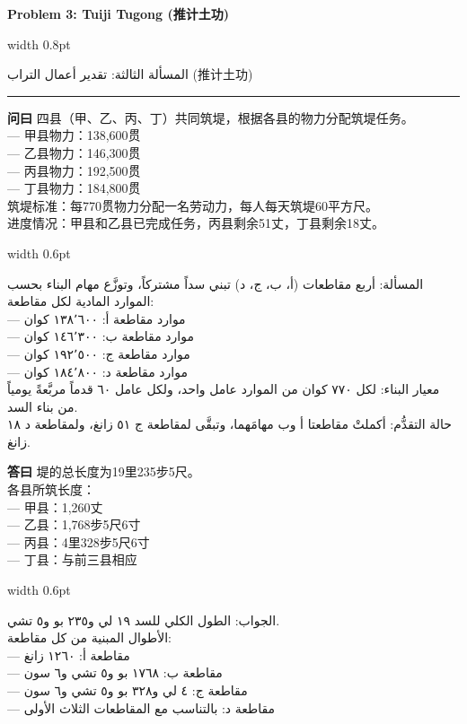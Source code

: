\documentclass[11pt,a4paper]{article}
\newlength{\cnwidth}
\newlength{\arwidth}
\newcommand{\paralleltext}[2]{%
  \par\medskip\noindent
  \begin{minipage}[t]{\cnwidth}%
    \small #1%
  \end{minipage}%
  \hfill\textcolor{colrule}{\vrule width 0.6pt}\hfill
  \begin{minipage}[t]{\arwidth}%
    \small\arabicfont\beginR #2\endR%
  \end{minipage}%
  \par\medskip
}
\newcommand{\parallelsection}[2]{%
  \par\bigskip\noindent
  \begin{minipage}[t]{\cnwidth}%
    \Large\bfseries\color{sectioncolor} #1%
  \end{minipage}%
  \hfill\textcolor{colrule}{\vrule width 0.8pt}\hfill
  \begin{minipage}[t]{\arwidth}%
    \Large\arabicfontbf\color{sectioncolor}\beginR #2\endR%
  \end{minipage}%
  \par\medskip\noindent\textcolor{colrule}{\rule{\textwidth}{0.6pt}}\par\medskip
}
\newcommand{\cnlabel}[1]{\textbf{\color{notecolor}#1}}
\newcommand{\arlabel}[1]{\arabicfontbf\color{notecolor}\beginR #1\endR}
\begin{document}
\newpage

\parallelsection{Problem 3: Tuiji Tugong (推计土功)}{المسألة الثالثة: تقدير أعمال التراب (推计土功)}

\paralleltext{%
\cnlabel{问曰} 四县（甲、乙、丙、丁）共同筑堤，根据各县的物力分配筑堤任务。\\
--- 甲县物力：138,600贯\\
--- 乙县物力：146,300贯\\
--- 丙县物力：192,500贯\\
--- 丁县物力：184,800贯\\
筑堤标准：每770贯物力分配一名劳动力，每人每天筑堤60平方尺。\\
进度情况：甲县和乙县已完成任务，丙县剩余51丈，丁县剩余18丈。%
}{%
\arlabel{المسألة:} أربع مقاطعات (أ، ب، ج، د) تبني سداً مشتركاً، وتوزَّع مهام البناء بحسب الموارد المادية لكل مقاطعة:\\
--- موارد مقاطعة أ: ١٣٨٬٦٠٠ كوان\\
--- موارد مقاطعة ب: ١٤٦٬٣٠٠ كوان\\
--- موارد مقاطعة ج: ١٩٢٬٥٠٠ كوان\\
--- موارد مقاطعة د: ١٨٤٬٨٠٠ كوان\\
معيار البناء: لكل ٧٧٠ كوان من الموارد عامل واحد، ولكل عامل ٦٠ قدماً مربَّعةً يومياً من بناء السد.\\
حالة التقدُّم: أكملتْ مقاطعتا أ وب مهامَهما، وتبقَّى لمقاطعة ج ٥١ زانغ، ولمقاطعة د ١٨ زانغ.
}

\paralleltext{%
\cnlabel{答曰} 堤的总长度为19里235步5尺。\\
各县所筑长度：\\
--- 甲县：1,260丈\\
--- 乙县：1,768步5尺6寸\\
--- 丙县：4里328步5尺6寸\\
--- 丁县：与前三县相应%
}{%
\arlabel{الجواب:} الطول الكلي للسد ١٩ لي و٢٣٥ بو و٥ تشي.\\
الأطوال المبنية من كل مقاطعة:\\
--- مقاطعة أ: ١٢٦٠ زانغ\\
--- مقاطعة ب: ١٧٦٨ بو و٥ تشي و٦ سون\\
--- مقاطعة ج: ٤ لي و٣٢٨ بو و٥ تشي و٦ سون\\
--- مقاطعة د: بالتناسب مع المقاطعات الثلاث الأولى
}
\end{document}
